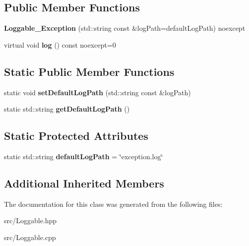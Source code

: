\subsection*{Public Member Functions}
\begin{DoxyCompactItemize}
\item 
\hypertarget{classstb_1_1Loggable__Exception_ac9d3585aec2e30412450212171438b5d}{{\bfseries Loggable\+\_\+\+Exception} (std\+::string const \&log\+Path=default\+Log\+Path) noexcept}\label{classstb_1_1Loggable__Exception_ac9d3585aec2e30412450212171438b5d}

\item 
\hypertarget{classstb_1_1Loggable__Exception_acaee6ba0994a125b124bdab9248a9c35}{virtual void {\bfseries log} () const noexcept=0}\label{classstb_1_1Loggable__Exception_acaee6ba0994a125b124bdab9248a9c35}

\end{DoxyCompactItemize}
\subsection*{Static Public Member Functions}
\begin{DoxyCompactItemize}
\item 
\hypertarget{classstb_1_1Loggable__Exception_a8fa593c2f5a4e1b24e7fa0dbdb05541c}{static void {\bfseries set\+Default\+Log\+Path} (std\+::string const \&log\+Path)}\label{classstb_1_1Loggable__Exception_a8fa593c2f5a4e1b24e7fa0dbdb05541c}

\item 
\hypertarget{classstb_1_1Loggable__Exception_a9697a07b78d25ea2d8cfa045e9f9a25d}{static std\+::string {\bfseries get\+Default\+Log\+Path} ()}\label{classstb_1_1Loggable__Exception_a9697a07b78d25ea2d8cfa045e9f9a25d}

\end{DoxyCompactItemize}
\subsection*{Static Protected Attributes}
\begin{DoxyCompactItemize}
\item 
\hypertarget{classstb_1_1Loggable__Exception_a6f2190f16d44acbe004ff119746307f8}{static std\+::string {\bfseries default\+Log\+Path} = \char`\"{}exception.\+log\char`\"{}}\label{classstb_1_1Loggable__Exception_a6f2190f16d44acbe004ff119746307f8}

\end{DoxyCompactItemize}
\subsection*{Additional Inherited Members}


The documentation for this class was generated from the following files\+:\begin{DoxyCompactItemize}
\item 
src/Loggable.\+hpp\item 
src/Loggable.\+cpp\end{DoxyCompactItemize}
